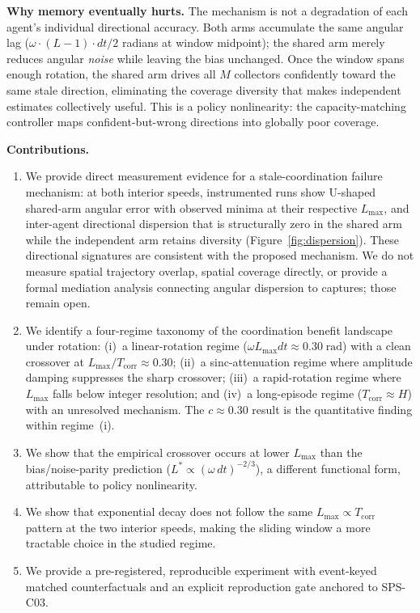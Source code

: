 \documentclass[sigconf,anonymous]{aamas}
\newcommand{\Lmax}{L_{\max}}
\newcommand{\Tcorr}{T_{\mathrm{corr}}}
\begin{document}
\medskip\noindent\textbf{Why memory eventually hurts.}
The mechanism is not a degradation of each agent's individual
directional accuracy. Both arms accumulate the same angular lag
($\omega \cdot (L{-}1) \cdot dt/2$ radians at window midpoint); the
shared arm merely reduces angular \emph{noise} while leaving
the bias unchanged. Once the window spans enough rotation, the
shared arm drives all $M$ collectors confidently toward the
same stale direction, eliminating the coverage diversity that
makes independent estimates collectively useful. This is a
policy nonlinearity: the capacity-matching controller maps
confident-but-wrong directions into globally poor coverage.

\medskip\noindent\textbf{Contributions.}
\begin{enumerate}
  \item We provide direct measurement evidence for a stale-coordination
  failure mechanism: at both interior speeds, instrumented runs show
  U-shaped shared-arm angular error with observed minima at their
  respective $\Lmax$, and inter-agent directional dispersion that is
  structurally zero in the shared arm while the independent arm retains
  diversity (Figure~\ref{fig:dispersion}).
  These directional signatures are consistent with the proposed mechanism.
  We do not measure spatial trajectory overlap, spatial coverage directly,
  or provide a formal mediation analysis connecting angular dispersion to
  captures; those remain open.
  \item We identify a four-regime taxonomy of the coordination
  benefit landscape under rotation: (i)~a linear-rotation regime
  ($\omega\Lmax dt \approx 0.30\;\mathrm{rad}$) with a clean
  crossover at $\Lmax/\Tcorr \approx 0.30$; (ii)~a sinc-attenuation
  regime where amplitude damping suppresses the sharp crossover;
  (iii)~a rapid-rotation regime where $\Lmax$ falls below integer
  resolution; and (iv)~a long-episode regime ($\Tcorr{\approx}H$)
  with an unresolved mechanism.
  The $c \approx 0.30$ result is the quantitative finding within
  regime~(i).
  \item We show that the empirical crossover occurs at lower $\Lmax$
  than the bias/noise-parity prediction ($L^* \propto (\omega\,dt)^{-2/3}$),
  a different functional form, attributable to policy nonlinearity.
  \item We show that exponential decay does not follow the
  same $\Lmax \propto \Tcorr$ pattern at the two interior speeds,
  making the sliding window a more tractable choice in the studied regime.
  \item We provide a pre-registered, reproducible experiment with
  event-keyed matched counterfactuals and an explicit reproduction
  gate anchored to SPS-C03.
\end{enumerate}
\end{document}
